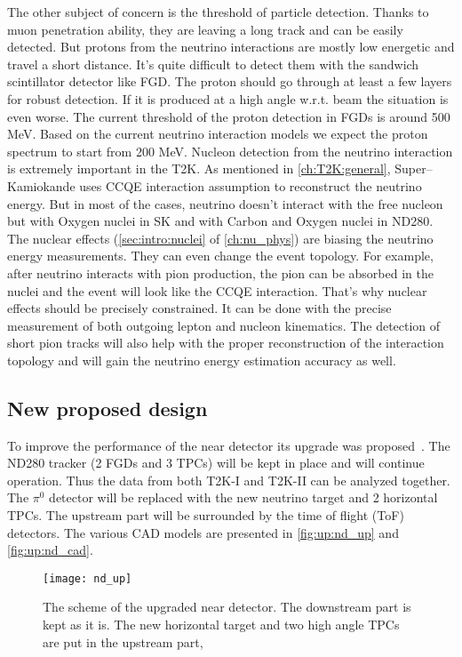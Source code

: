 \documentclass[main.tex]{subfiles}
\begin{document}
The other subject of concern is the threshold of particle detection. Thanks to muon penetration ability, they are leaving a long track and can be easily detected. But protons from the neutrino interactions are mostly low energetic and travel a short distance. It's quite difficult to detect them with the sandwich scintillator detector like FGD. The proton should go through at least a few layers for robust detection. If it is produced at a high angle w.r.t. beam the situation is even worse. The current threshold of the proton detection in FGDs is around 500 MeV. Based on the current neutrino interaction models we expect the proton spectrum to start from 200 MeV. Nucleon detection from the neutrino interaction is extremely important in the T2K. As mentioned in \autoref{ch:T2K:general}, Super--Kamiokande uses CCQE interaction assumption to reconstruct the neutrino energy. But in most of the cases, neutrino doesn't interact with the free nucleon but with Oxygen nuclei in SK and with Carbon and Oxygen nuclei in ND280. The nuclear effects (\autoref{sec:intro:nuclei} of \autoref{ch:nu_phys}) are biasing the neutrino energy measurements. They can even change the event topology. For example, after neutrino interacts with pion production, the pion can be absorbed in the nuclei and the event will look like the CCQE interaction. That's why nuclear effects should be precisely constrained. It can be done with the precise measurement of both outgoing lepton and nucleon kinematics. The detection of short pion tracks will also help with the proper reconstruction of the interaction topology and will gain the neutrino energy estimation accuracy as well.

\subsection{New proposed design}

To improve the performance of the near detector its upgrade was proposed~\cite{Abe2019}. The ND280 tracker (2 FGDs and 3 TPCs) will be kept in place and will continue operation. Thus the data from both T2K-I and T2K-II can be analyzed together. The $\pi^0$ detector will be replaced with the new neutrino target and 2 horizontal TPCs. The upstream part will be surrounded by the time of flight (ToF) detectors. The various CAD models are presented in \autoref{fig:up:nd_up} and \autoref{fig:up:nd_cad}.

\begin{figure}[!ht]
  \centering
  \texttt{[image: nd\_up]}
  \caption{The scheme of the upgraded near detector. The downstream part is kept as it is. The new horizontal target and two high angle TPCs are put in the upstream part,}
  \label{fig:up:nd_up}
\end{figure}
\end{document}
